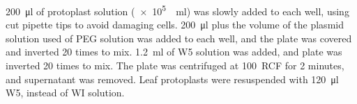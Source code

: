 \documentclass[../main.tex]{subfiles}
\begin{document}
\SI{200}{\micro\litre} of protoplast solution (\SI{e5}{\per\ml}) was slowly added to each well, using cut pipette tips to avoid damaging cells.
\SI{200}{\micro\litre} plus the volume of the plasmid solution used of PEG solution was added to each well, and the plate was covered and inverted 20 times to mix.
\SI{1.2}{\ml} of W5 solution was added, and plate was inverted 20 times to mix.
The plate was centrifuged at 100~RCF for 2 minutes, and supernatant was removed.
Leaf protoplasts were resuspended with \SI{120}{\micro\litre} W5, instead of WI solution.
\end{document}
